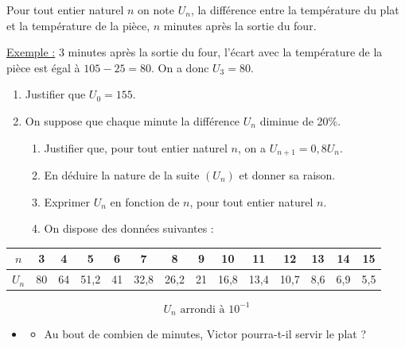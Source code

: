 \documentclass[10pt]{article}
\begin{document}
Pour tout entier naturel $n$ on note $U_n$, la différence entre la température du plat et la température de la pièce, $n$ minutes après la sortie du four.

\underline{Exemple :} 3 minutes après la sortie du four, l'écart avec la température de la pièce est égal à $105 - 25 = 80$. On a donc $U_3 = 80$.

\begin{enumerate}
\item Justifier que $U_0 = 155$.

\item On suppose que chaque minute la différence $U_n$ diminue de 20\%.
\begin{enumerate}
\item Justifier que, pour tout entier naturel $n$, on a $U_{n+1} = 0,8U_n$.
\item En déduire la nature de la suite $(U_n)$ et donner sa raison.
\item Exprimer $U_n$ en fonction de $n$, pour tout entier naturel $n$.
\item On dispose des données suivantes :
\end{enumerate}
\end{enumerate}

\vspace{-0.9\baselineskip}
\begin{center}
\begin{tabular}{|c|c|c|c|c|c|c|c|c|c|c|c|c|c|}
\hline
$n$ & 3 & 4 & 5 & 6 & 7 & 8 & 9 & 10 & 11 & 12 & 13 & 14 & 15 \\
\hline
$U_n$ & 80 & 64 & 51,2 & 41 & 32,8 & 26,2 & 21 & 16,8 & 13,4 & 10,7 & 8,6 & 6,9 & 5,5 \\
\hline
\end{tabular}
\end{center}

\vspace{-0.9\baselineskip}
\[U_n \text{ arrondi à } 10^{-1}\]

\vspace{-0.5\baselineskip}
\begin{itemize}
    \item[]
    \begin{itemize}
    		\item[] Au bout de combien de minutes, Victor pourra-t-il servir le plat ?
	\end{itemize}
\end{itemize}
\end{document}
